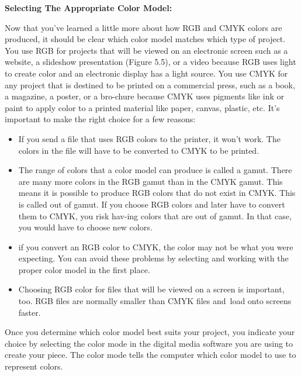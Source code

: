\documentclass{report}
\begin{document}
         \bigbreak \noindent \bigbreak \noindent 
         \begin{large}
           \textbf{Selecting The Appropriate Color Model:}
         \end{large}
         \bigbreak \noindent
           Now that you’ve learned a little more about how RGB and CMYK colors are produced, it should be clear which color model matches which type of project. You use RGB for projects that will be viewed on an electronic screen such as a website, a slideshow presentation (Figure 5.5), or a video because RGB uses light to create color and an electronic display has a light source. You use CMYK for any project that is destined to be printed on a commercial press, such as a book, a magazine, a poster, or a bro-chure because CMYK uses pigments like ink or paint to apply color to a printed material like paper, canvas, plastic, etc. It’s important to make the right choice for a few reasons:
         \bigbreak \noindent 
         \begin{itemize}
            \item If you send a file that uses RGB colors to the printer, it won’t work. The colors in the file will have to be converted to CMYK to be printed. 
            \item The range of colors that a color model can produce is called a gamut. There are many more colors in the RGB gamut than in the CMYK gamut. This means it is possible to produce RGB colors that do not exist in CMYK. This is called out of gamut. If you choose RGB colors and later have to convert them to CMYK, you risk hav-ing colors that are out of gamut. In that case, you would have to choose new colors. 
            \item if you convert an RGB color to CMYK, the color may not be what you were expecting. You can avoid these problems by selecting and working with the proper color model in the first place.
            \item Choosing RGB color for files that will be viewed on a screen is important, too. RGB files are normally smaller than CMYK files and load onto screens faster.
         \end{itemize}
         \bigbreak \noindent 
          Once you determine which color model best suits your project, you indicate your choice by selecting the color mode in the digital media software you are using to create your piece. The color mode tells the computer which color model to use to represent colors. 
\end{document}
